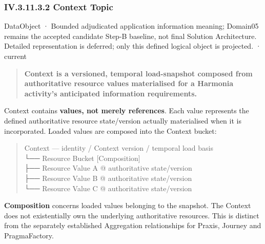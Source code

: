 \subsubsection*{IV.3.11.3.2 Context Topic}
\label{navigation:IV.3.11.3.2}

\label{element:76ded4866bf443dabc0849d68b215690}
{\small DataObject · Bounded adjudicated application information meaning; Domain05 remains the accepted candidate Step-B baseline, not final Solution Architecture. Detailed representation is deferred; only this defined logical object is projected. · current}\par

\begin{quote}


\textbf{Context is a versioned, temporal load-snapshot composed from authoritative
resource values materialised for a Harmonia activity's anticipated information
requirements.}



\end{quote}


Context contains \textbf{values, not merely references}. Each value represents the
defined authoritative resource state/version actually materialised when it is
incorporated. Loaded values are composed into the Context bucket:



\begin{quote}\small\ttfamily
Context — identity / Context version / temporal load basis\\
  └── Resource Bucket                         [Composition]\\
        ├── Resource Value A @ authoritative state/version\\
        ├── Resource Value B @ authoritative state/version\\
        └── Resource Value C @ authoritative state/version\\

\end{quote}


\textbf{Composition} concerns loaded values belonging to the snapshot. The Context
does not existentially own the underlying authoritative resources. This is
distinct from the separately established Aggregation relationships for Praxis,
Journey and PragmaFactory.



